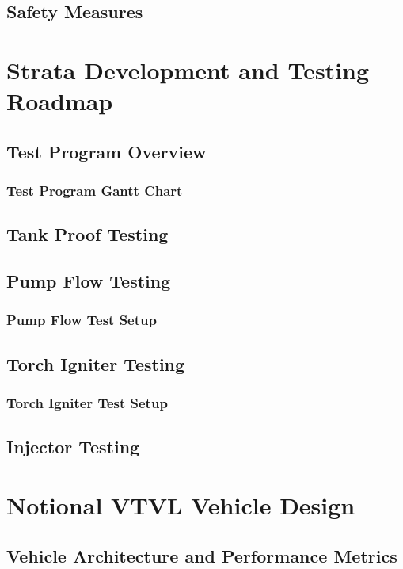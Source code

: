 \documentclass[12pt, letterpaper]{article}
\begin{document}
\subsection{Safety Measures}

\newpage

\section{Strata Development and Testing Roadmap}
\subsection{Test Program Overview}
\subsubsection{Test Program Gantt Chart}
\subsection{Tank Proof Testing}
\subsection{Pump Flow Testing}
\subsubsection{Pump Flow Test Setup}
\subsection{Torch Igniter Testing}
\subsubsection{Torch Igniter Test Setup}
\subsection{Injector Testing}

\newpage

\section{Notional VTVL Vehicle Design}
\subsection{Vehicle Architecture and Performance Metrics}
\end{document}
